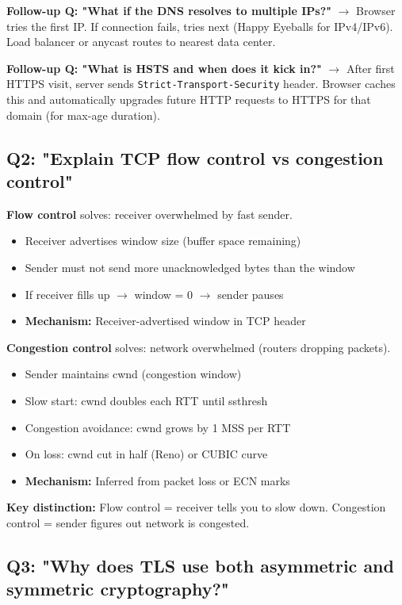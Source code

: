 \documentclass[11pt]{article}
\providecommand{\tightlist}{\setlength{\itemsep}{1pt}\setlength{\parskip}{0pt}}
\begin{document}
\textbf{Follow-up Q: "What if the DNS resolves to multiple IPs?"}
\(\rightarrow\) Browser tries the first IP. If connection fails, tries next (Happy Eyeballs for IPv4/IPv6). Load balancer or anycast routes to nearest data center.

\textbf{Follow-up Q: "What is HSTS and when does it kick in?"}
\(\rightarrow\) After first HTTPS visit, server sends \texttt{Strict-Transport-Security} header. Browser caches this and automatically upgrades future HTTP requests to HTTPS for that domain (for max-age duration).

\subsection{Q2: "Explain TCP flow control vs congestion control"}\label{q2-explain-tcp-flow-control-vs-congestion-control}

\textbf{Flow control} solves: receiver overwhelmed by fast sender.

\begin{itemize}
\tightlist
\item
  Receiver advertises window size (buffer space remaining)
\item
  Sender must not send more unacknowledged bytes than the window
\item
  If receiver fills up \(\rightarrow\) window = 0 \(\rightarrow\) sender pauses
\item
  \textbf{Mechanism:} Receiver-advertised window in TCP header
\end{itemize}

\textbf{Congestion control} solves: network overwhelmed (routers dropping packets).

\begin{itemize}
\tightlist
\item
  Sender maintains cwnd (congestion window)
\item
  Slow start: cwnd doubles each RTT until ssthresh
\item
  Congestion avoidance: cwnd grows by 1 MSS per RTT
\item
  On loss: cwnd cut in half (Reno) or CUBIC curve
\item
  \textbf{Mechanism:} Inferred from packet loss or ECN marks
\end{itemize}

\textbf{Key distinction:} Flow control = receiver tells you to slow down. Congestion control = sender figures out network is congested.

\subsection{Q3: "Why does TLS use both asymmetric and symmetric cryptography?"}\label{q3-why-does-tls-use-both-asymmetric-and-symmetric-cryptography}
\end{document}
